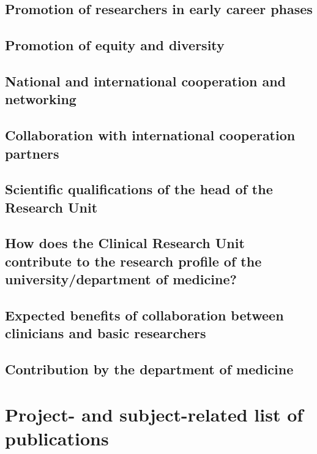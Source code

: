 \documentclass[english, 53.02]{proposal}
\begin{document}
\subsection{Promotion of researchers in early career phases}

\subsection{Promotion of equity and diversity}

\subsection{National and international cooperation and networking}

\subsection{Collaboration with international cooperation partners}


\subsection{Scientific qualifications of the head of the Research Unit}

\subsection{How does the Clinical Research Unit contribute to the research profile of the university/department of medicine?}

\subsection{Expected benefits of collaboration between clinicians and basic researchers}

\subsection{Contribution by the department of medicine}


\section{Project- and subject-related list of publications}
\printbibliography[heading=none]
\end{document}
